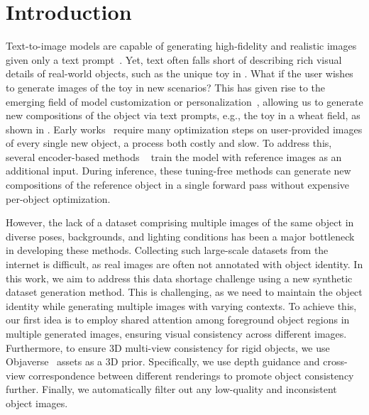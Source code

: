 \section{Introduction}
\label{sec:intro}
Text-to-image models are capable of generating high-fidelity and realistic images given only a text prompt~\cite{peebles2023scalable,saharia2022photorealistic,rombach2022high,esser2024scaling}. Yet, text often falls short of describing rich visual details of real-world objects, such as the unique toy in . What if the user wishes to generate images of the toy in new scenarios? This has given rise to the emerging field of model customization or personalization~\cite{ruiz2022dreambooth,gal2022image,kumari2023multi,chen2023subject,wei2023elite}, allowing us to generate new compositions of the object via text prompts, e.g., {\menlo the toy in a wheat field}, as shown in . Early works~\cite{gal2022image,dreamboothimpl,kumari2023multi} require many optimization steps on user-provided images of every single new object, a process both costly and slow. 
To address this, several encoder-based methods
~\cite{wei2023elite,chen2023subject,li2023blip,ye2023ip,song2024moma} train the model with reference images as an additional input. During inference, these tuning-free methods can generate new compositions of the reference object in a single forward pass without expensive per-object optimization.




However, the lack of a dataset comprising multiple images of the same object in diverse poses, backgrounds, and lighting conditions has been a major bottleneck in developing these methods. Collecting such large-scale datasets from the internet is difficult, as real images are often not annotated with object identity. 
In this work, we aim to address this data shortage challenge using a new synthetic dataset generation method. %
This is challenging, as we need to maintain the object identity while generating multiple images with varying contexts. %
To achieve this, our first idea is to employ shared attention among foreground object regions in multiple generated images, ensuring visual consistency across different images. %
Furthermore, to ensure 3D multi-view consistency for rigid objects, we use Objaverse~\cite{deitke2024objaverse} assets as a 3D prior. Specifically, we use depth guidance and %
cross-view correspondence between different renderings to promote object consistency further. Finally, we automatically filter out any low-quality and inconsistent object images. 



